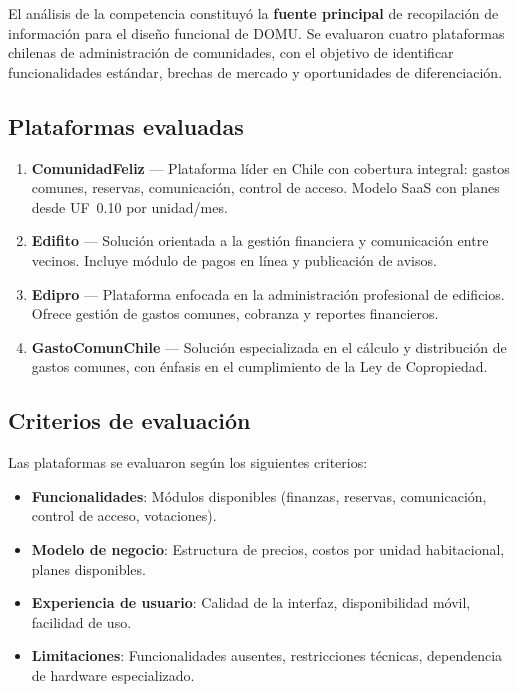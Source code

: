 El análisis de la competencia constituyó la \textbf{fuente principal} de recopilación de información para el diseño funcional de DOMU. Se evaluaron cuatro plataformas chilenas de administración de comunidades, con el objetivo de identificar funcionalidades estándar, brechas de mercado y oportunidades de diferenciación.

\subsection{Plataformas evaluadas}

\begin{enumerate}
    \item \textbf{ComunidadFeliz} --- Plataforma líder en Chile con cobertura integral: gastos comunes, reservas, comunicación, control de acceso. Modelo SaaS con planes desde UF~0.10 por unidad/mes.

    \item \textbf{Edifito} --- Solución orientada a la gestión financiera y comunicación entre vecinos. Incluye módulo de pagos en línea y publicación de avisos.

    \item \textbf{Edipro} --- Plataforma enfocada en la administración profesional de edificios. Ofrece gestión de gastos comunes, cobranza y reportes financieros.

    \item \textbf{GastoComunChile} --- Solución especializada en el cálculo y distribución de gastos comunes, con énfasis en el cumplimiento de la Ley de Copropiedad.
\end{enumerate}

\subsection{Criterios de evaluación}

Las plataformas se evaluaron según los siguientes criterios:
\begin{itemize}
    \item \textbf{Funcionalidades}: Módulos disponibles (finanzas, reservas, comunicación, control de acceso, votaciones).
    \item \textbf{Modelo de negocio}: Estructura de precios, costos por unidad habitacional, planes disponibles.
    \item \textbf{Experiencia de usuario}: Calidad de la interfaz, disponibilidad móvil, facilidad de uso.
    \item \textbf{Limitaciones}: Funcionalidades ausentes, restricciones técnicas, dependencia de hardware especializado.
\end{itemize}

